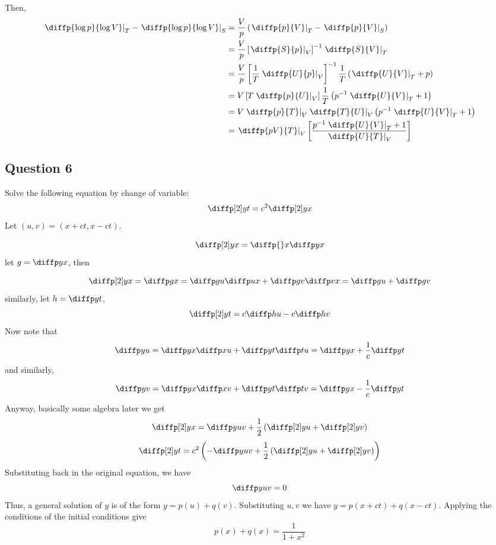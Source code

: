 \documentclass[12pt]{article}
\begin{document}
Then,
\[
\begin{aligned}
    \left.\diffp{\log p}{{\log V}}\right|_{T} - \left.\diffp{\log p}{{\log V}}\right|_{S}
            &= \frac{V}{p}\left(\left.\diffp{p}{V}\right|_{T} - \left.\diffp{p}{V}\right|_{S}\right)\\
            &= \frac{V}{p}\left[\left.\diffp{S}{p}\right|_{V}\right]^{-1} \left.\diffp{S}{V}\right|_{T}\\
            &= \frac{V}{p}\left[\frac{1}{T}\left.\diffp{U}{p}\right|_{V}\right]^{-1} \frac{1}{T}\left(\left.\diffp{U}{V}\right|_{T} + p\right)\\
            &= V\left[T\left.\diffp{p}{U}\right|_{V}\right] \frac{1}{T}\left(p^{-1}\left.\diffp{U}{V}\right|_{T} + 1\right)\\
            &= V\left.\diffp{p}{T}\right|_{V}\left.\diffp{T}{U}\right|_{V} \left(p^{-1}\left.\diffp{U}{V}\right|_{T} + 1\right)\\
            &= \left.\diffp{pV}{T}\right|_{V} \left[\frac{p^{-1}\left.\diffp{U}{V}\right|_{T} + 1}{\left.\diffp{U}{T}\right|_{V}}\right]\\
\end{aligned}
\]

\newpage
\subsection{Question 6}

Solve the following equation by change of variable:
\[
    \diffp[2]yt = c^{2}\diffp[2]yx
\]
Let $(u,v) = (x+ct,x-ct)$.

\[
    \diffp[2]yx = \diffp{}x\diffp yx
\]
let $g = \diffp yx$, then

\[
    \diffp[2]yx = \diffp gx = \diffp gu \diffp ux + \diffp gv \diffp vx = \diffp gu + \diffp gv
\]
similarly, let $h = \diffp yt$,
\[
    \diffp[2]yt = c \diffp hu - c \diffp hv
\]
Now note that
\[
\diffp yu = \diffp yx \diffp xu + \diffp yt \diffp tu = \diffp yx + \frac{1}{c}\diffp yt
\]
and similarly,
\[
\diffp yv = \diffp yx \diffp xv + \diffp yt \diffp tv = \diffp yx - \frac{1}{c}\diffp yt
\]
Anyway, basically some algebra later we get
\[
    \diffp[2]yx = \diffp y{uv} + \frac{1}{2}\left(\diffp[2]yu + \diffp[2]yv\right)
\]
\[
    \diffp[2]yt = c^{2}\left(-\diffp y{uv} + \frac{1}{2}\left(\diffp[2]yu + \diffp[2]yv\right)\right)
\]
Substituting back in the original equation, we have
\[
    \diffp y{uv} = 0
\]
Thus, a general solution of $y$ is of the form $y = p(u) + q(v)$.
Substituting $u,v$ we have $y = p(x + ct) + q(x - ct)$.
Applying the conditions of the initial conditions give
\[
p(x) + q(x) = \frac{1}{1 + x^{2}}
\]
\end{document}

